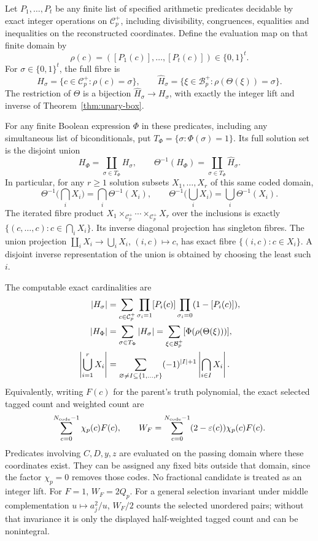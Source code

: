 \begin{theorem}
\label{thm:unary-truth-fibres}
Let \(P_1,\ldots,P_t\) be any finite list of specified arithmetic
predicates decidable by exact integer operations on
\(\mathcal C_p^+\), including divisibility, congruences,
equalities and inequalities on the reconstructed coordinates.
Define the evaluation map on that finite domain by
\[
 \rho(c)=([P_1(c)],\ldots,[P_t(c)])\in\{0,1\}^t.
\]
For \(\sigma\in\{0,1\}^t\), the full fibre is
\[
 H_\sigma=\{c\in\mathcal C_p^+:\rho(c)=\sigma\},\qquad
 \widehat H_\sigma=
 \{\xi\in\mathcal B_p^+:\rho(\Theta(\xi))=\sigma\}.
\]
The restriction of \(\Theta\) is a bijection
\(\widehat H_\sigma\to H_\sigma\), with exactly the
integer lift and inverse of Theorem~\ref{thm:unary-box}.

For any finite Boolean expression \(\Phi\) in these predicates,
including any simultaneous list of biconditionals, put
\(T_\Phi=\{\sigma:\Phi(\sigma)=1\}\).
Its full solution set is the disjoint union
\[
 H_\Phi=\coprod_{\sigma\in T_\Phi}H_\sigma,\qquad
 \Theta^{-1}(H_\Phi)=
           \coprod_{\sigma\in T_\Phi}\widehat H_\sigma .
\]
In particular, for any \(r\ge1\) solution subsets \(X_1,\ldots,X_r\)
of this same coded domain,
\[
 \Theta^{-1}\Big(\bigcap_iX_i\Big)=\bigcap_i\Theta^{-1}(X_i),
 \qquad
 \Theta^{-1}\Big(\bigcup_iX_i\Big)=\bigcup_i\Theta^{-1}(X_i).
\]
The iterated fibre product
\(X_1\times_{\mathcal C_p^+}\cdots
\times_{\mathcal C_p^+}X_r\) over the inclusions is exactly
\(\{(c,\ldots,c):c\in\bigcap_iX_i\}\).
Its inverse diagonal projection has singleton fibres.
The union projection
\(\coprod_iX_i\to\bigcup_iX_i\), \((i,c)\mapsto c\),
has exact fibre \(\{(i,c):c\in X_i\}\).
A disjoint inverse representation of the union is obtained
by choosing the least such \(i\).

The computable exact cardinalities are
\begin{align}
 |H_\sigma|&=\sum_{c\in\mathcal C_p^+}
     \prod_{\sigma_i=1}[P_i(c)]
     \prod_{\sigma_i=0}(1-[P_i(c)]),\label{eq:truth-cardinality}\\
 |H_\Phi|&=\sum_{\sigma\in T_\Phi}|H_\sigma|
       =\sum_{\xi\in\mathcal B_p^+}
                       [\Phi(\rho(\Theta(\xi)))],\notag\\
 \left|\bigcup_{i=1}^rX_i\right|
     &=\sum_{\varnothing\ne I\subseteq\{1,\ldots,r\}}
           (-1)^{|I|+1}\left|\bigcap_{i\in I}X_i\right|.\notag
\end{align}
Equivalently, writing \(F(c)\) for the parent's truth
polynomial, the exact selected tagged count and weighted count are
\[
 \sum_{c=0}^{N_{\rm code}-1}\chi_p(c)F(c),\qquad
 W_F=\sum_{c=0}^{N_{\rm code}-1}
                  (2-\varepsilon(c))\chi_p(c)F(c).
\]
Predicates involving \(C,D,y,z\) are evaluated on the passing
domain where these coordinates exist.  They can be assigned any
fixed bits outside that domain, since the factor \(\chi_p=0\)
removes those codes.  No fractional candidate is treated as an
integer lift.  For \(F=1\), \(W_F=2Q_p\).
For a general selection invariant under middle complementation
\(u\mapsto a_j^2/u\), \(W_F/2\) counts the selected unordered
pairs; without that invariance it is only the displayed
half-weighted tagged count and can be nonintegral.
\end{theorem}
